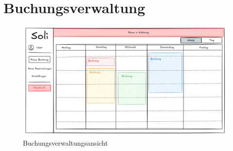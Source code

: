 \section{Buchungsverwaltung}

\begin{figure}[ht]
    \centering
    \includegraphics[scale=0.15]{figures/checkout.png}
    \caption{Buchungsverwaltungsansicht}
    \label{fig:fklsj}
\end{figure}
